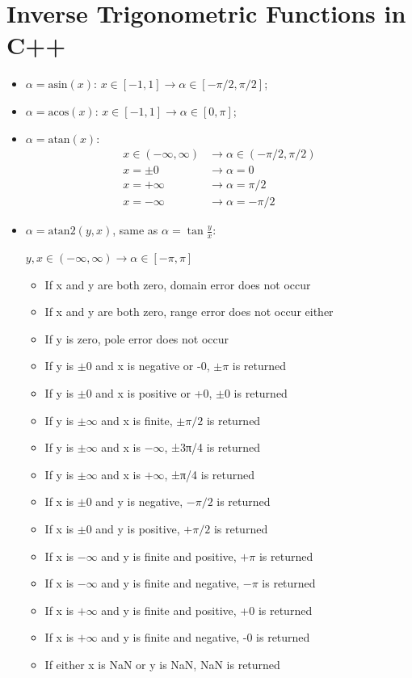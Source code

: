 \documentclass{article}
\begin{document}
\section{Inverse Trigonometric Functions in C++}
\begin{itemize}
\item $\alpha = \text{asin}(x)$: $x \in [-1, 1] \to \alpha \in [-\pi/2, \pi/2]$;

\item $\alpha = \text{acos}(x)$: $x \in [-1, 1] \to \alpha \in [0, \pi]$;

\item $\alpha = \text{atan}(x)$: 
\begin{displaymath}
\begin{aligned}
x \in (-\infty,\infty) &\to \alpha \in (-\pi/2, \pi/2) \\
x = \pm 0 &\to \alpha = 0 \\
x = +\infty &\to \alpha = \pi/2 \\
x = -\infty &\to \alpha = -\pi/2
\end{aligned}
\end{displaymath}

\item $\alpha = \text{atan2}(y, x)$, same as $\alpha = \tan{\frac{y}{x}}$: \\
\centerline{$y,x \in (-\infty,\infty) \to \alpha \in [-\pi, \pi]$}
\begin{itemize}
\item If x and y are both zero, domain error does not occur
\item If x and y are both zero, range error does not occur either
\item If y is zero, pole error does not occur
\item If y is $\pm 0$ and x is negative or -0, $\pm \pi$ is returned
\item If y is $\pm 0$ and x is positive or +0, $\pm 0$ is returned
\item If y is $\pm \infty$ and x is finite, $\pm \pi/2$ is returned
\item If y is $\pm \infty$ and x is $-\infty$, ±3π/4 is returned
\item If y is $\pm \infty$ and x is $+\infty$, ±π/4 is returned
\item If x is $\pm 0$ and y is negative, $-\pi/2$ is returned
\item If x is $\pm 0$ and y is positive, $+\pi/2$ is returned
\item If x is $-\infty$ and y is finite and positive, $+\pi$ is returned
\item If x is $-\infty$ and y is finite and negative, $-\pi$ is returned
\item If x is $+\infty$ and y is finite and positive, +0 is returned
\item If x is $+\infty$ and y is finite and negative, -0 is returned
\item If either x is NaN or y is NaN, NaN is returned
\end{itemize}
\end{itemize}
\end{document}
